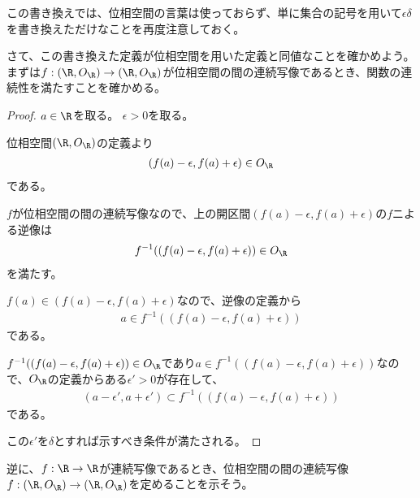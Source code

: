 \documentclass[uplatex]{jsarticle}
\begin{document}
この書き換えでは、位相空間の言葉は使っておらず、単に集合の記号を用いて$\epsilon\delta$を書き換えただけなことを再度注意しておく。

さて、この書き換えた定義が位相空間を用いた定義と同値なことを確かめよう。
まずは$f:(\R,O_\R)\to(\R,O_\R)$が位相空間の間の連続写像であるとき、関数の連続性を満たすことを確かめる。

\begin{proof}
  $a\in\R$を取る。
  $\epsilon>0$を取る。
  
  位相空間$(\R,O_\R)$の定義より
  \begin{align*}
    (f(a)-\epsilon,f(a)+\epsilon)\in O_\R
  \end{align*}
  である。
  
  $f$が位相空間の間の連続写像なので、上の開区間$(f(a)-\epsilon,f(a)+\epsilon)$の$f$ニよる逆像は
  \begin{align*}
    f^{-1}((f(a)-\epsilon,f(a)+\epsilon))\in O_\R
  \end{align*}
  を満たす。
  
  $f(a)\in(f(a)-\epsilon,f(a)+\epsilon)$なので、逆像の定義から
  \begin{align*}
    a\in f^{-1}((f(a)-\epsilon,f(a)+\epsilon))
  \end{align*}
  である。
  
  $f^{-1}((f(a)-\epsilon,f(a)+\epsilon))\in O_\R$であり$a\in f^{-1}((f(a)-\epsilon,f(a)+\epsilon))$なので、$O_\R$の定義からある$\epsilon'>0$が存在して、
  \begin{align*}
    (a-\epsilon',a+\epsilon')\subset f^{-1}((f(a)-\epsilon,f(a)+\epsilon))
  \end{align*}
  である。

  この$\epsilon'$を$\delta$とすれば示すべき条件が満たされる。
\end{proof}

逆に、$f:\R\to\R$が連続写像であるとき、位相空間の間の連続写像$f:(\R,O_\R)\to(\R,O_\R)$を定めることを示そう。
\end{document}
